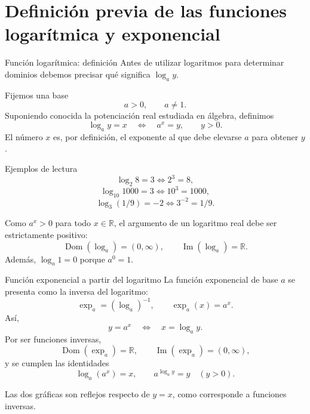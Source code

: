 \documentclass[aspectratio=169,10pt]{beamer}
\newcommand{\R}{\mathbb{R}}
\newcommand{\Dom}{\operatorname{Dom}}
\newcommand{\Ima}{\operatorname{Im}}
\begin{document}
\section{Definición previa de las funciones logarítmica y exponencial}
\begin{frame}{Función logarítmica: definición}
Antes de utilizar logaritmos para determinar dominios debemos precisar qué
significa $\log_a y$.

Fijemos una base
\[
a>0,\qquad a\neq1.
\]
Suponiendo conocida la potenciación real estudiada en álgebra, definimos
\[
\boxed{\log_a y=x\quad\Longleftrightarrow\quad a^x=y},\qquad y>0.
\]
El número $x$ es, por definición, el exponente al que debe elevarse $a$ para
obtener $y$.

\begin{exampleblock}{Ejemplos de lectura}
\[
\log_2 8=3\Longleftrightarrow2^3=8,
\]
\[
\log_{10}1000=3\Longleftrightarrow10^3=1000,
\]
\[
\log_3(1/9)=-2\Longleftrightarrow3^{-2}=1/9.
\]
\end{exampleblock}

Como $a^x>0$ para todo $x\in\R$, el argumento de un logaritmo real debe ser
estrictamente positivo:
\[
\boxed{\Dom(\log_a)=(0,\infty)},\qquad
\boxed{\Ima(\log_a)=\R}.
\]
Además, $\log_a1=0$ porque $a^0=1$.
\end{frame}

\begin{frame}{Función exponencial a partir del logaritmo}
La función exponencial de base $a$ se presenta como la inversa del logaritmo:
\[
\boxed{\exp_a=(\log_a)^{-1}},
\qquad
\boxed{\exp_a(x)=a^x}.
\]
Así,
\[
\boxed{y=a^x\quad\Longleftrightarrow\quad x=\log_a y}.
\]
Por ser funciones inversas,
\[
\Dom(\exp_a)=\R,
\qquad
\Ima(\exp_a)=(0,\infty),
\]
y se cumplen las identidades
\[
\log_a(a^x)=x,
\qquad
a^{\log_a y}=y\quad(y>0).
\]

\begin{center}
\end{center}
Las dos gráficas son reflejos respecto de $y=x$, como corresponde a funciones
inversas.
\end{frame}
\end{document}
